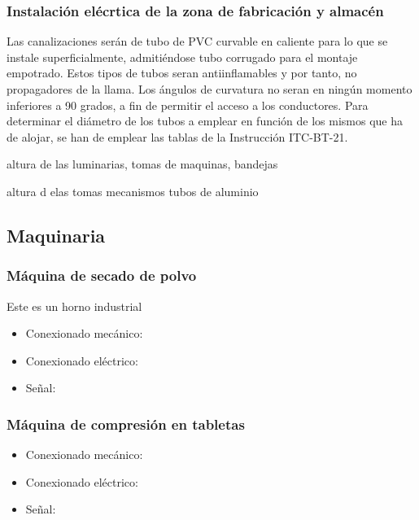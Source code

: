 \subsubsection{Instalación elécrtica de la zona de fabricación y almacén}

Las canalizaciones serán de tubo de PVC curvable en caliente para lo que se instale superficialmente, admitiéndose tubo corrugado para el montaje empotrado. Estos tipos de tubos seran antiinflamables y por tanto, no propagadores de la llama.
Los ángulos de curvatura no seran en ningún momento inferiores a 90 grados, a fin de permitir el acceso a los conductores.
Para determinar el diámetro de los tubos a emplear en función de los mismos que ha de alojar, se han de emplear las tablas de la Instrucción ITC-BT-21.




altura de las luminarias, tomas de maquinas, bandejas

altura d elas tomas mecanismos tubos de aluminio



\subsection{Maquinaria}
	\subsubsection{Máquina de secado de polvo}
	Este es un horno industrial 
		\begin{itemize}
				\item{Conexionado mecánico:}\\
				
				\item{Conexionado eléctrico:}\\
				
				\item{Señal:}\\
				
		\end{itemize}

	\subsubsection{Máquina de compresión en tabletas}
		\begin{itemize}
				\item{Conexionado mecánico:}\\
				
				\item{Conexionado eléctrico:}\\
				
				\item{Señal:}\\
			
		\end{itemize}


